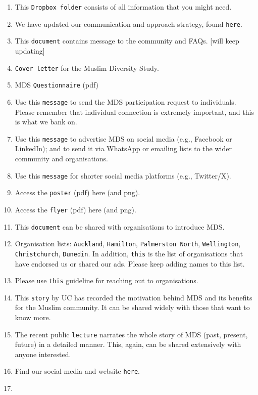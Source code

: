 \documentclass[
]{interact}
\providecommand{\tightlist}{%
  \setlength{\itemsep}{0pt}\setlength{\parskip}{0pt}}\usepackage{longtable,booktabs,array}
\begin{document}
\begin{enumerate}
\def\labelenumi{\arabic{enumi}.}
\tightlist
\item
  This \texttt{Dropbox\ folder} consists of all information that you
  might need.
\item
  We have updated our communication and approach strategy, found
  \texttt{here}.
\item
  This \texttt{document} contains message to the community and FAQs.
  {[}will keep updating{]}
\item
  \texttt{Cover\ letter} for the Muslim Diversity Study.
\item
  MDS \texttt{Questionnaire} (pdf)
\item
  Use this \texttt{message} to send the MDS participation request to
  individuals. Please remember that individual connection is extremely
  important, and this is what we bank on.
\item
  Use this \texttt{message} to advertise MDS on social media (e.g.,
  Facebook or LinkedIn); and to send it via WhatsApp or emailing lists
  to the wider community and organisations.
\item
  Use this \texttt{message} for shorter social media platforms (e.g.,
  Twitter/X).
\item
  Access the \texttt{poster} (pdf) here (and png).
\item
  Access the \texttt{flyer} (pdf) here (and png).
\item
  This \texttt{document} can be shared with organisations to introduce
  MDS.
\item
  Organisation lists: \texttt{Auckland}, \texttt{Hamilton},
  \texttt{Palmerston\ North}, \texttt{Wellington},
  \texttt{Christchurch}, \texttt{Dunedin}. In addition, \texttt{this} is
  the list of organisations that have endorsed us or shared our ads.
  Please keep adding names to this list.
\item
  Please use \texttt{this} guideline for reaching out to organisations.
\item
  This \texttt{story} by UC has recorded the motivation behind MDS and
  its benefits for the Muslim community. It can be shared widely with
  those that want to know more.
\item
  The recent public \texttt{lecture} narrates the whole story of MDS
  (past, present, future) in a detailed manner. This, again, can be
  shared extensively with anyone interested.
\item
  Find our social media and website \texttt{here}.
\item

\end{enumerate}
\end{document}
